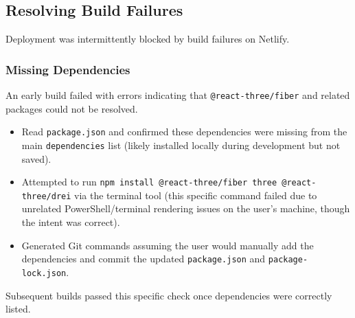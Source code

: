 \documentclass[11pt]{article} %
\begin{document}
\subsection{Resolving Build Failures}
Deployment was intermittently blocked by build failures on Netlify.

\subsubsection{Missing Dependencies}
\begin{description}[style=unboxed,leftmargin=0pt]
    \item[Problem:] An early build failed with errors indicating that \texttt{@react-three/fiber} and related packages could not be resolved.
    \item[AI Assistance:]
        \begin{itemize}
            \item Read \texttt{package.json} and confirmed these dependencies were missing from the main \texttt{dependencies} list (likely installed locally during development but not saved).
            \item Attempted to run \texttt{npm install @react-three/fiber three @react-three/drei} via the terminal tool (this specific command failed due to unrelated PowerShell/terminal rendering issues on the user's machine, though the intent was correct).
            \item Generated Git commands assuming the user would manually add the dependencies and commit the updated \texttt{package.json} and \texttt{package-lock.json}.
        \end{itemize}
    \item[Outcome:] Subsequent builds passed this specific check once dependencies were correctly listed.
\end{description}
\end{document}
